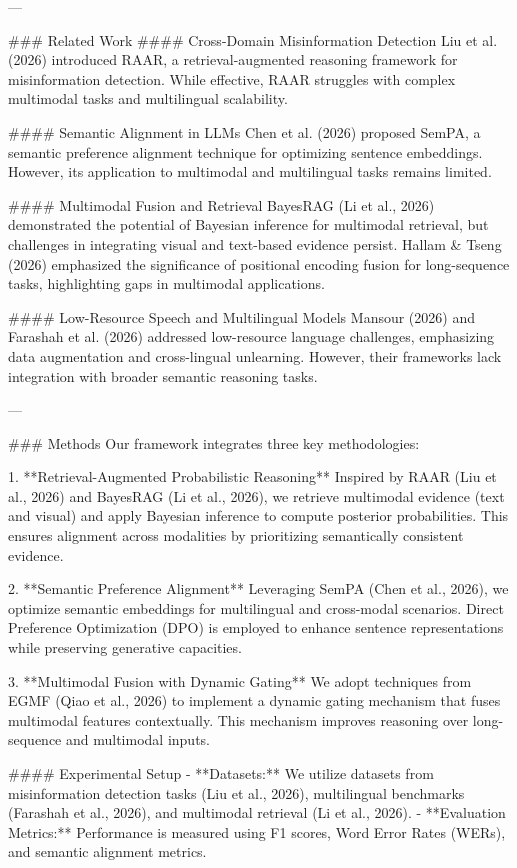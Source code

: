 ---

### Related Work  
#### Cross-Domain Misinformation Detection  
Liu et al. (2026) introduced RAAR, a retrieval-augmented reasoning framework for misinformation detection. While effective, RAAR struggles with complex multimodal tasks and multilingual scalability.

#### Semantic Alignment in LLMs  
Chen et al. (2026) proposed SemPA, a semantic preference alignment technique for optimizing sentence embeddings. However, its application to multimodal and multilingual tasks remains limited.

#### Multimodal Fusion and Retrieval  
BayesRAG (Li et al., 2026) demonstrated the potential of Bayesian inference for multimodal retrieval, but challenges in integrating visual and text-based evidence persist. Hallam & Tseng (2026) emphasized the significance of positional encoding fusion for long-sequence tasks, highlighting gaps in multimodal applications.

#### Low-Resource Speech and Multilingual Models  
Mansour (2026) and Farashah et al. (2026) addressed low-resource language challenges, emphasizing data augmentation and cross-lingual unlearning. However, their frameworks lack integration with broader semantic reasoning tasks.

---

### Methods  
Our framework integrates three key methodologies:  

1. **Retrieval-Augmented Probabilistic Reasoning**  
Inspired by RAAR (Liu et al., 2026) and BayesRAG (Li et al., 2026), we retrieve multimodal evidence (text and visual) and apply Bayesian inference to compute posterior probabilities. This ensures alignment across modalities by prioritizing semantically consistent evidence.

2. **Semantic Preference Alignment**  
Leveraging SemPA (Chen et al., 2026), we optimize semantic embeddings for multilingual and cross-modal scenarios. Direct Preference Optimization (DPO) is employed to enhance sentence representations while preserving generative capacities.

3. **Multimodal Fusion with Dynamic Gating**  
We adopt techniques from EGMF (Qiao et al., 2026) to implement a dynamic gating mechanism that fuses multimodal features contextually. This mechanism improves reasoning over long-sequence and multimodal inputs.

#### Experimental Setup  
- **Datasets:** We utilize datasets from misinformation detection tasks (Liu et al., 2026), multilingual benchmarks (Farashah et al., 2026), and multimodal retrieval (Li et al., 2026).  
- **Evaluation Metrics:** Performance is measured using F1 scores, Word Error Rates (WERs), and semantic alignment metrics.  

